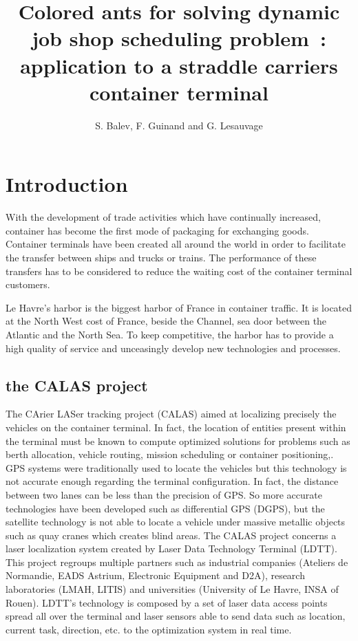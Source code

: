\documentclass[a4paper,10pt]{article}
\title{Colored ants for solving dynamic job shop scheduling problem : application to a straddle carriers container terminal
}
\author{S. Balev, F. Guinand and G. Lesauvage}
\begin{document}
\maketitle

\begin{abstract}

\end{abstract}

\section{Introduction}
With the development of trade activities which have continually increased, container has become the first mode of packaging for exchanging goods. Container terminals have been created all around the world in order to facilitate the transfer between ships and trucks or trains. The performance of these transfers has to be considered to reduce the waiting cost of the container terminal customers.

Le Havre’s harbor is the biggest harbor of France in container traffic. It is located at the North West cost of France, beside the Channel, sea door between the Atlantic and the North Sea. To keep competitive, the harbor has to provide a high quality of service and unceasingly develop new technologies and processes.




\subsection{the CALAS project}
The CArier LASer tracking project (CALAS) aimed at localizing precisely the vehicles on the container terminal. In fact, the location of entities present within the terminal must be known to compute optimized solutions for problems such as berth allocation, vehicle routing, mission scheduling or container positioning,. GPS systems were traditionally used to locate the vehicles but this technology is not accurate enough regarding the terminal configuration. In fact, the distance between two lanes can be less than the precision of GPS. So more accurate technologies have been developed such as differential GPS (DGPS), but the satellite technology is not able to locate a vehicle under massive metallic objects such as quay cranes which creates blind areas. The CALAS project concerns a laser localization system created by Laser Data Technology Terminal (LDTT). This project regroups multiple partners such as industrial companies (Ateliers de Normandie, EADS Astrium, Electronic Equipment and D2A), research laboratories (LMAH, LITIS) and universities (University of Le Havre, INSA of Rouen). LDTT's technology is composed by a set of laser data access points spread all over the terminal and laser sensors able to send data such as location, current task, direction, etc. to the optimization system in real time.
\end{document}
